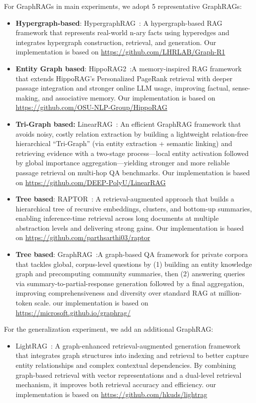 For GraphRAGs in main experiments, we adopt 5 representative GraphRAGs:
\begin{itemize}
    \item \textbf{Hypergraph-based}: HypergraphRAG~\cite{HyperGraph}: A hypergraph-based RAG framework that represents real-world n-ary facts using hyperedges and integrates hypergraph construction, retrieval, and generation. Our implementation is based on \url{https://github.com/LHRLAB/Graph-R1}
    \item \textbf{Entity Graph based}: HippoRAG2~\cite{HippoRAG2}:A memory-inspired RAG framework that extends HippoRAG’s Personalized PageRank retrieval with deeper passage integration and stronger online LLM usage, improving factual, sense-making, and associative memory. Our implementation is based on \url{https://github.com/OSU-NLP-Group/HippoRAG}
    \item \textbf{Tri-Graph based:} LinearRAG~\cite{LinearRAG}: An efficient GraphRAG framework that avoids noisy, costly relation extraction by building a lightweight relation-free hierarchical “Tri-Graph” (via entity extraction + semantic linking) and retrieving evidence with a two-stage process—local entity activation followed by global importance aggregation—yielding stronger and more reliable passage retrieval on multi-hop QA benchmarks. Our implementation is based on \url{https://github.com/DEEP-PolyU/LinearRAG}
    \item \textbf{Tree based}: RAPTOR~\cite{RAPTOR}: A retrieval-augmented approach that builds a hierarchical tree of recursive embeddings, clusters, and bottom-up summaries, enabling inference-time retrieval across long documents at multiple abstraction levels and delivering strong gains. Our implementation is based on \url{https://github.com/parthsarthi03/raptor}
    \item \textbf{Tree based}: GraphRAG~\cite{GraphRAG}:A graph-based QA framework for private corpora that tackles global, corpus-level questions by (1) building an entity knowledge graph and precomputing community summaries, then (2) answering queries via summary-to-partial-response generation followed by a final aggregation, improving comprehensiveness and diversity over standard RAG at million-token scale. our implementation is based on \url{https://microsoft.github.io/graphrag/}
\end{itemize}
For the generalization experiment, we add an additional GraphRAG:
\begin{itemize}
    \item LightRAG~\cite{LightRAG}: A graph-enhanced retrieval-augmented generation framework that integrates graph structures into indexing and retrieval to better capture entity relationships and complex contextual dependencies. By combining graph-based retrieval with vector representations and a dual-level retrieval mechanism, it improves both retrieval accuracy and efficiency. our implementation is based on \url{https://github.com/hkuds/lightrag}
\end{itemize}

